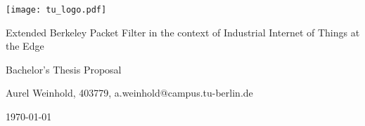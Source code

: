 \documentclass[11pt, a4paper]{scrartcl}
\begin{document}
\begin{title}

    \begin{center}
        \texttt{[image: tu\_logo.pdf]}

        \vspace*{2em}
        \LARGE
        Extended Berkeley Packet Filter in the context of Industrial Internet of
        Things at the Edge

        \vspace*{1em}
        \small
        Bachelor's Thesis Proposal

        \vspace*{1em}
        Aurel Weinhold, 403779, a.weinhold@campus.tu-berlin.de

        \vspace*{1em}
        \today

    \end{center}

\end{title}





\end{document}
